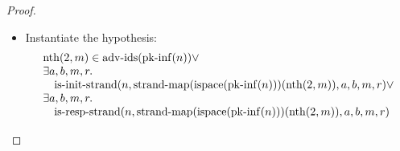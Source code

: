 \documentclass[11pt]{article}
\theoremstyle{plain}
\begin{document}
\begin{proof}
\begin{itemize}[leftmargin=2.8em, itemsep=4pt, parsep=1pt]
\begin{itemize}[leftmargin=2.8em, itemsep=4pt, parsep=1pt]
\begin{itemize}[leftmargin=2.8em, itemsep=4pt, parsep=1pt]
  \end{itemize}
  \item[\textbf{323}] Instantiate the hypothesis:
\begin{equation*}
\begin{array}{@{}l@{}} \operatorname{nth}(2, m) \in \operatorname{adv\text{-}ids}(\operatorname{pk\text{-}inf}(n)) \vee \\ \exists a, b, m, r. \\ \quad \operatorname{is\text{-}init\text{-}strand}(n, \operatorname{strand\text{-}map}(\operatorname{ispace}(\operatorname{pk\text{-}inf}(n)))(\operatorname{nth}(2, m)), a, b, m, r) \vee \\ \exists a, b, m, r. \\ \quad \operatorname{is\text{-}resp\text{-}strand}(n, \operatorname{strand\text{-}map}(\operatorname{ispace}(\operatorname{pk\text{-}inf}(n)))(\operatorname{nth}(2, m)), a, b, m, r) \end{array}
\end{equation*}


\end{itemize}
\end{itemize}
\end{proof}
\end{document}
